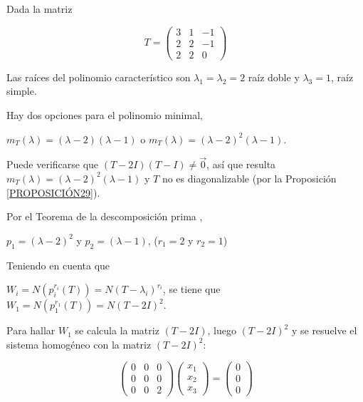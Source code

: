 \begin{example}
\label{ejTDP}
Dada la matriz 

$$T=\left(\begin{array}{ccc} 3 & 1 &  -1 \\ 2 & 2 & -1
\\ 2 & 2 & 0
\end{array}
 \right)$$


\bigskip


Las raíces del polinomio característico son $\lambda_1=\lambda_2=2$ raíz doble y $\lambda_3=1$, raíz simple.

\bigskip

Hay dos opciones para el polinomio minimal, 

\bigskip

$m_T(\lambda)=(\lambda - 2) (\lambda-1)$ o $m_T(\lambda)=(\lambda - 2)^{2} (\lambda-1)$.

\bigskip

Puede verificarse que  $(T-2I)(T-I)\neq \vec{0}$, así que resulta $m_T(\lambda)=(\lambda - 2)^{2} (\lambda-1)$ y $T$ no es diagonalizable  (por la Proposición \ref{PROPOSICIÓN29}).

\bigskip

Por el Teorema de la descomposición prima ,

\bigskip

$p_1=(\lambda - 2) ^2$ y  $p_2=(\lambda - 1)$,  ($r_1=2$ y $r_2=1$) 

\bigskip

Teniendo en cuenta que

\bigskip

 $W_i=N(p_i^{r_i}(T))=N(T-\lambda_i)^{r_i}$,
 se tiene que $W_1=N(p_1^{r_1}(T))=N(T-2I)^2$.

 \bigskip

Para hallar $W_1$ se calcula la matriz $(T-2I)$,  luego $(T-2I)^2$ y se resuelve el sistema homogéneo con la matriz $(T-2I)^2$:

\bigskip

$$\left(\begin{array}{ccc} 0 & 0&  0 \\ 0 & 0 & 0
\\ 0 & 0 & 2
\end{array}
 \right)  \left(\begin{array}{c} x_1\\ x_2
\\ x_3
\end{array}
 \right) =  \left(\begin{array}{c} 0\\ 0
\\ 0
\end{array}
 \right)$$ 


\end{example}
